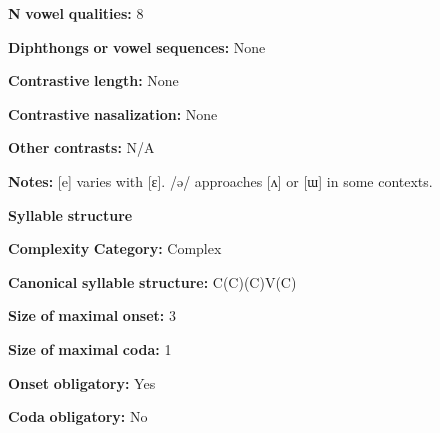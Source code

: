 \begin{styleBody}
\textbf{N} \textbf{vowel} \textbf{qualities:} 8
\end{styleBody}

\begin{styleBody}
\textbf{Diphthongs} \textbf{or} \textbf{vowel} \textbf{sequences:} None
\end{styleBody}

\begin{styleBody}
\textbf{Contrastive} \textbf{length:} None
\end{styleBody}

\begin{styleBody}
\textbf{Contrastive} \textbf{nasalization:} None
\end{styleBody}

\begin{styleBody}
\textbf{Other} \textbf{contrasts:} N/A
\end{styleBody}

\begin{styleBody}
\textbf{Notes:} [e] varies with [ɛ]. /ə/ approaches [ʌ] or [ɯ] in some contexts.
\end{styleBody}

\begin{styleBody}
\textbf{Syllable} \textbf{structure}
\end{styleBody}

\begin{styleBody}
\textbf{Complexity} \textbf{Category:} Complex
\end{styleBody}

\begin{styleBody}
\textbf{Canonical} \textbf{syllable} \textbf{structure:} C(C)(C)V(C) \citep[30-32]{Plaisier2007}
\end{styleBody}

\begin{styleBody}
\textbf{Size} \textbf{of} \textbf{maximal} \textbf{onset:} 3
\end{styleBody}

\begin{styleBody}
\textbf{Size} \textbf{of} \textbf{maximal} \textbf{coda:} 1
\end{styleBody}

\begin{styleBody}
\textbf{Onset} \textbf{obligatory:} Yes
\end{styleBody}

\begin{styleBody}
\textbf{Coda} \textbf{obligatory:} No
\end{styleBody}


